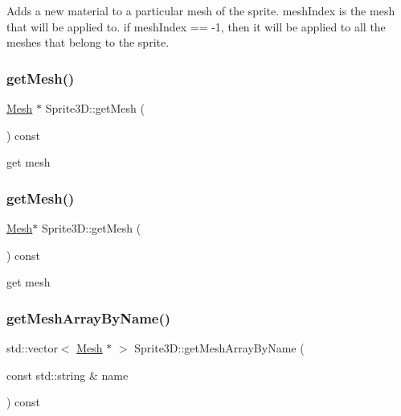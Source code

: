 Adds a new material to a particular mesh of the sprite. mesh\+Index is the mesh that will be applied to. if mesh\+Index == -\/1, then it will be applied to all the meshes that belong to the sprite. \mbox{\label{classSprite3D_ac2ecd09672fb2ab13df3bda9a4ed40c9}} 
\subsubsection{\texorpdfstring{get\+Mesh()}{getMesh()}\hspace{0.1cm}{\footnotesize\ttfamily [1/2]}}
{\footnotesize\ttfamily \hyperlink{classMesh}{Mesh} $\ast$ Sprite3\+D\+::get\+Mesh (\begin{DoxyParamCaption}{ }\end{DoxyParamCaption}) const\hspace{0.3cm}{\ttfamily [inline]}}

get mesh \mbox{\label{classSprite3D_ad3f22d4c57c9320ab42e08bf9c97363d}} 
\subsubsection{\texorpdfstring{get\+Mesh()}{getMesh()}\hspace{0.1cm}{\footnotesize\ttfamily [2/2]}}
{\footnotesize\ttfamily \hyperlink{classMesh}{Mesh}$\ast$ Sprite3\+D\+::get\+Mesh (\begin{DoxyParamCaption}{ }\end{DoxyParamCaption}) const}

get mesh \mbox{\label{classSprite3D_af26e7cf641858e2d96fffae21db2d253}} 
\subsubsection{\texorpdfstring{get\+Mesh\+Array\+By\+Name()}{getMeshArrayByName()}\hspace{0.1cm}{\footnotesize\ttfamily [1/2]}}
{\footnotesize\ttfamily std\+::vector$<$ \hyperlink{classMesh}{Mesh} $\ast$ $>$ Sprite3\+D\+::get\+Mesh\+Array\+By\+Name (\begin{DoxyParamCaption}\item[{const std\+::string \&}]{name }\end{DoxyParamCaption}) const}

